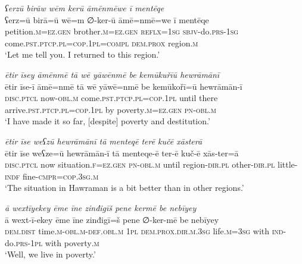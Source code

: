 \ea \label{ŽM.53}
\textit{ʕerzū birāw wēm kerū āmēnmēwe ī mentēqe} \\ 
\gll ʕerz=ū birā=ū wē=m ∅-ker-ū āmē=nmē=we ī mentēqe \\ 
 petition\textsc{.m}\textsc{=ez.gen} brother\textsc{.m}\textsc{=ez.gen} \textsc{reflx}\textsc{=\textsc{1sg}} \textsc{sbjv-}do\textsc{.prs}\textsc{-\textsc{1sg}} come\textsc{.pst}\textsc{.ptcp}\textsc{.pl}\textsc{=cop}\textsc{.\textsc{1pl}}\textsc{=compl} \textsc{dem.prox} region\textsc{.m} \\ 
\glt `Let me tell you. I returned to this region.'
\z 
 
\ea \label{ŽM.54}
\textit{ētir īsey āmēnmē tā wē yāwēnmē be kemūkuřīū hewrāmānī} \\ 
\gll ētir īse-ī āmē=nmē tā wē yāwē=nmē be kemūkořī=ū hewrāmān-ī \\ 
 \textsc{disc}.\textsc{ptcl} now\textsc{-obl}\textsc{.m} come\textsc{.pst}\textsc{.ptcp}\textsc{.pl}\textsc{=cop}\textsc{.\textsc{1pl}} until there arrive\textsc{.pst}\textsc{.ptcp}\textsc{.pl}\textsc{=cop}\textsc{.\textsc{1pl}} by poverty\textsc{.m}\textsc{=ez.gen} \textsc{pn}\textsc{-obl}\textsc{.m} \\ 
\glt `I have made it so far, [despite] poverty and destitution.'
\z 
 
\ea \label{ŽM.55}
\textit{ētir īse weʕzū hewrāmānī tā menteqē terē kučē xāsterā} \\ 
\gll ētir īse weʕze=ū hewrāmān-ī tā menteqe-ē ter-ē kuč-ē xās-ter=ā \\ 
 \textsc{disc}.\textsc{ptcl} now situation\textsc{.f}\textsc{=ez.gen} \textsc{pn}\textsc{-obl}\textsc{.m} until region\textsc{-dir}\textsc{.pl} other\textsc{-dir}\textsc{.pl} little\textsc{-indf} fine\textsc{-cmpr}\textsc{=cop}\textsc{.3sg}\textsc{.m} \\ 
\glt `The situation in Hawraman is a bit better than in other regions.'
\z 
 
\ea \label{ŽM.57}
\textit{ā wextīyekey ēme īne zinđigīš pene kermē be nebīyey} \\ 
\gll ā wext-ī-ekey ēme īne zinđigī=š pene ∅-ker-mē be nebīyey \\ 
 \textsc{dem.dist} time\textsc{.m}\textsc{-obl}\textsc{.m}\textsc{-def}\textsc{.obl}\textsc{.m} \textsc{1pl} \textsc{dem.prox}\textsc{.dir}\textsc{.m}\textsc{.3sg} life\textsc{.m}\textsc{=3sg} with \textsc{ind-}do\textsc{.prs}\textsc{-\textsc{1pl}} with poverty\textsc{.m} \\ 
\glt `Well, we live in poverty.'
\z 
 
